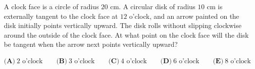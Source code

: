 A clock face is a circle of radius $20$ cm. A circular disk of radius $10$ cm is externally tangent to the clock face at $12$ o'clock, and an arrow painted on the disk initially points vertically upward. The disk rolls without slipping clockwise around the outside of the clock face. At what point on the clock face will the disk be tangent when the arrow next points vertically upward?

$\textbf{(A)}\ \text{2 o'clock}\qquad\textbf{(B)}\ \text{3 o'clock}\qquad\textbf{(C)}\ \text{4 o'clock}\qquad\textbf{(D)}\ \text{6 o'clock}\qquad\textbf{(E)}\ \text{8 o'clock}$
